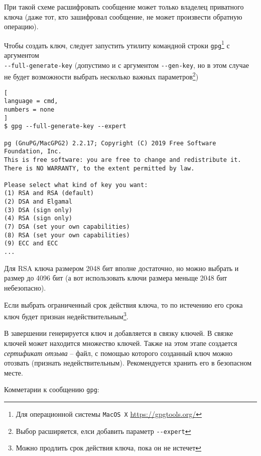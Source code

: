 \documentclass[%
	11pt,
	a4paper,
	utf8,
		]{article}
\begin{document}
При такой схеме расшифровать сообщение может только владелец приватного ключа (даже тот, кто зашифровал сообщение, не может произвести обратную операцию).


Чтобы создать ключ, следует запустить утилиту командной строки \texttt{gpg}\footnote{Для операционной системы \texttt{MacOS X} \url{https://gpgtools.org/}} с аргументом \\\mbox{\lstinline{--full-generate-key}} (допустимо и с аргументом \lstinline{--gen-key}, но в этом случае не будет возможности выбрать несколько важных параметров\footnote{Выбор расширяется, елси добавить параметр \lstinline{--expert}})

\begin{lstlisting}[
language = cmd,
numbers = none
]
$ gpg --full-generate-key --expert

pg (GnuPG/MacGPG2) 2.2.17; Copyright (C) 2019 Free Software Foundation, Inc.
This is free software: you are free to change and redistribute it.
There is NO WARRANTY, to the extent permitted by law.

Please select what kind of key you want:
(1) RSA and RSA (default)
(2) DSA and Elgamal
(3) DSA (sign only)
(4) RSA (sign only)
(7) DSA (set your own capabilities)
(8) RSA (set your own capabilities)
(9) ECC and ECC
...
\end{lstlisting}


Для RSA ключа размером 2048 бит вполне достаточно, но можно выбрать и размер до 4096 бит (а вот использовать ключи размера меньще 2048 бит небезопасно).

Если выбрать ограниченный срок действия ключа, то по истечению его срока ключ будет признан недействительным\footnote{Можно продлить срок действия ключа, пока он не истечет}.

В завершении генерируется ключ и добавляется в связку ключей. В связке ключей может находится множество ключей. Также на этом этапе создается \emph{сертификат отзыва} -- файл, с помощью которого созданный ключ можно отозвать (признать недействительным). Рекомендуется хранить его в безопасном месте.

Комметарии к сообщению \texttt{gpg}:
\end{document}
